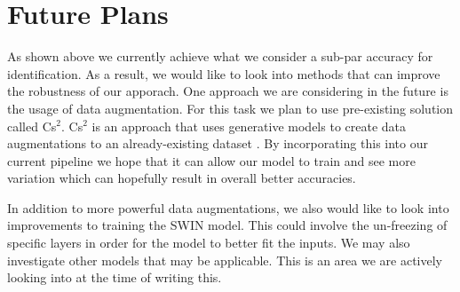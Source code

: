 \documentclass[10pt,twocolumn,letterpaper]{article}
\begin{document}
\section{Future Plans}

As shown above we currently achieve what we consider a sub-par accuracy for identification. As a result, we would like to look into methods that can improve the robustness of our apporach. One approach we are considering in the future is the usage of data augmentation. For this task we plan to use pre-existing solution called Cs$^2$. Cs$^2$ is an approach that uses generative models to create data augmentations to an already-existing dataset \cite{cs2}. By incorporating this into our current pipeline we hope that it can allow our model to train and see more variation which can hopefully result in overall better accuracies.  \par

In addition to more powerful data augmentations, we also would like to look into improvements to training the SWIN model. This could involve the un-freezing of specific layers in order for the model to better fit the inputs. We may also investigate other models that may be applicable. This is an area we are actively looking into at the time of writing this. \par 










{\small


}
\end{document}
